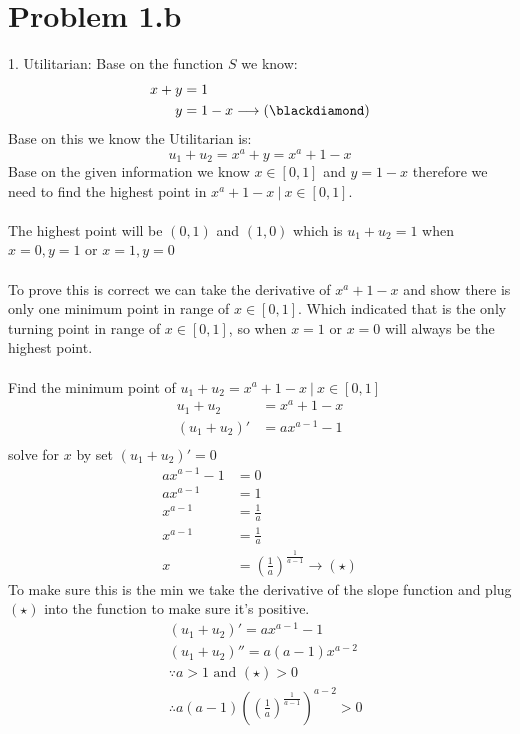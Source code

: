 \documentclass{article}
\begin{document}
\section{Problem 1.b}
1. Utilitarian:
Base on the function $S$ we know:
\begin{align*}
x + y &= 1\\
y &= 1 - x \longrightarrow (\blackdiamond)
\end{align*}
Base on this we know the Utilitarian is:
$$u_1 + u_2 = x^a + y = x^a + 1 - x$$
Base on the given information we know $x \in [0,1]$ and $y = 1 - x$ therefore we need to find the highest point in $x^a + 1 - x\ |\ x \in [0,1]$.\\\\
The highest point will be $(0,1)$ and $(1,0)$ which is $u_1 + u_2 = 1$ when $x = 0, y = 1$ or $x = 1, y = 0$\\\\
To prove this is correct we can take the derivative of $x^a + 1 - x$ and show there is only one minimum point in range of $x \in [0,1]$. Which indicated that is the only turning point in range of $x \in [0,1]$, so when $x = 1$ or $x = 0$ will always be the highest point.\\\\
Find the minimum point of $u_1 + u_2 = x^a + 1 - x\ |\ x \in [0,1]$
\begin{align*}
u_1 + u_2 &= x^a + 1 - x\\
(u_1 + u_2)' &= ax^{a-1} - 1\\
\end{align*}
solve for $x$ by set $(u_1 + u_2)' = 0$
\begin{align*}
ax^{a-1} - 1 &= 0\\
ax^{a-1} &= 1\\
x^{a-1} &= \frac{1}{a}\\
x^{a-1} &= \frac{1}{a}\\
x &= \left(\frac{1}{a}\right)^{\frac{1}{a-1}} \longrightarrow (\star)
\end{align*}
To make sure this is the min we take the derivative of the slope function and plug $(\star)$ into the function to make sure it's positive.
\begin{align*}
&(u_1 + u_2)' = ax^{a-1} - 1\\
&(u_1 + u_2)'' = a(a-1)x^{a-2}\\
&\because a > 1 \text{ and } (\star) > 0\\
&\therefore a(a-1)\left(\left(\frac{1}{a}\right)^{\frac{1}{a-1}}\right)^{a-2} > 0\\
\end{align*}
\end{document}

